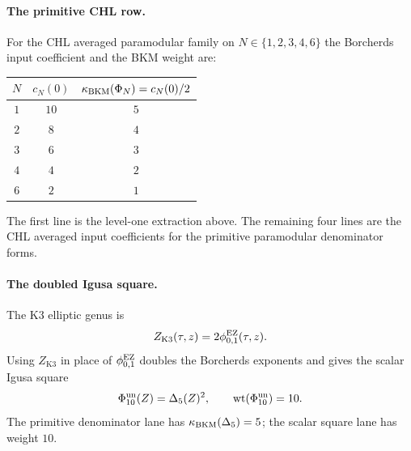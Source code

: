 \paragraph{The primitive CHL row.}
For the CHL averaged paramodular family on
$N\in\{1,2,3,4,6\}$ the Borcherds input coefficient and the BKM weight
are:
\begin{center}
\begin{tabular}{c|c|c}
\hline
$N$ & $c_N(0)$ & $\kappa_{\mathrm{BKM}}(\Phi_N)=c_N(0)/2$\\
\hline
$1$ & $10$ & $5$\\
$2$ & $8$ & $4$\\
$3$ & $6$ & $3$\\
$4$ & $4$ & $2$\\
$6$ & $2$ & $1$\\
\hline
\end{tabular}
\end{center}
The first line is the level-one extraction above.  The remaining four
lines are the CHL averaged input coefficients for the primitive
paramodular denominator forms.

\paragraph{The doubled Igusa square.}
The K3 elliptic genus is
\[
 Z_{\mathrm{K3}}(\tau,z)=2\phi_{0,1}^{\mathrm{EZ}}(\tau,z).
\]
Using $Z_{\mathrm{K3}}$ in place of $\phi_{0,1}^{\mathrm{EZ}}$ doubles the Borcherds
exponents and gives the scalar Igusa square
\[
 \Phi_{10}^{\mathrm{un}}(Z)=\Delta_5(Z)^2,\qquad
 \mathrm{wt}(\Phi_{10}^{\mathrm{un}})=10 .
\]
The primitive denominator lane has $\kappa_{\mathrm{BKM}}(\Delta_5)=5$; the scalar
square lane has weight $10$.

